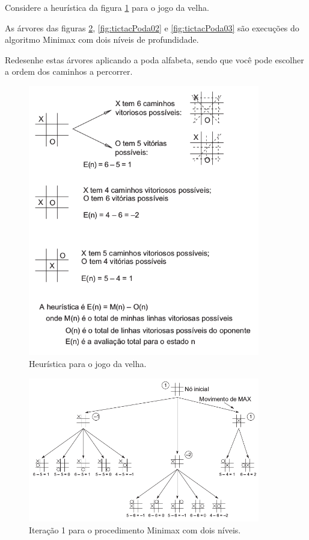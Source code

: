 \documentclass[12pt]{exam}
\begin{document}
\begin{questions}
\item Considere a heurística da figura \ref{fig:tictacHeu} para o jogo da velha. 

As árvores das figuras \ref{fig:tictacPoda01}, \ref{fig:tictacPoda02} e \ref{fig:tictacPoda03} são execuções do algoritmo Minimax com dois níveis de profundidade.

Redesenhe estas árvores aplicando a poda alfabeta, sendo que você pode escolher a ordem dos caminhos a percorrer.

\begin{figure}[h]
    \centering
    \includegraphics[width=0.90\textwidth]{tictacHeu}
    \caption{Heurística para o jogo da velha.}
    \label{fig:tictacHeu}
\end{figure}

\begin{figure}[h]
    \centering
    \includegraphics[width=0.90\textwidth]{tictacPoda01}
    \caption{Iteração 1 para o procedimento Minimax com dois níveis.}
    \label{fig:tictacPoda01}
\end{figure}


\end{questions}
\end{document}
